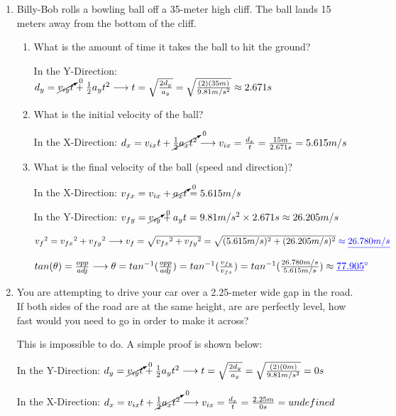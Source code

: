 \documentclass[letterpaper, 12pt]{article}
\begin{document}
\begin{enumerate}
\item Billy-Bob rolls a bowling ball off a 35-meter high cliff.  The ball lands 15 meters away from the bottom of the cliff.
\begin{enumerate}
	\item What is the amount of time it takes the ball to hit the ground?
\color{red}

	In the Y-Direction: $d_y = \cancelto{0}{v_{iy}t} + \frac{1}{2}a_y t^2 \longrightarrow t = \sqrt{\frac{2 d_y}{a_y}} = \sqrt{\frac{(2) (35m)}{9.81 m/s^2}} \approx 2.671 s $
\color{black}

	\item What is the initial velocity of the ball?
	\color{red}
	
	In the X-Direction: $d_x = v_{ix}t+\cancelto{0}{\frac{1}{2}a_xt^2} \longrightarrow v_{ix} = \frac{d_x}{t} = \frac{15 m}{2.671s} = 5.615 m/s$
	
	\color{black}
	
	\item What is the final velocity of the ball (speed and direction)?
		\color{red}

In the X-Direction: $ v_{fx} = v_{ix} + \cancelto{0}{a_x t} = 5.615 m/s$  

In the Y-Direction: $ v_{fy} = \cancelto{0}{v_{iy}} + a_y t = 9.81 m/s^2 \times 2.671s \approx 26.205 m/s$

$ {v_f}^2 = {v_{fx}}^2 + {v_{fy}}^2 \longrightarrow {v_f} = \sqrt{{v_{fx}}^2 + {v_{fy}}^2} = \sqrt{(5.615 m/s)^2 + (26.205 m/s)^2}  \color{blue} \approx \underline{26.780 m/s}  $
\color{red}	

$tan(\theta) = \frac{opp}{adj} \longrightarrow \theta = tan^{-1}(\frac{opp}{adj}) = tan^{-1}(\frac{v_{fy}}{v_{fx}}) =  tan^{-1}(\frac{26.780 m/s}{5.615 m/s}) \approx \color{blue} \underline{77.905} \degree  $


\color{black}




\end{enumerate}



\item You are attempting to drive your car over a 2.25-meter wide gap in the road.  If both sides of the road are at the same height, are are perfectly level, how fast would you need to go in order to make it across?
\color{red}

	This is impossible to do.  A simple proof is shown below:

	In the Y-Direction: $d_y = \cancelto{0}{v_{iy}t} + \frac{1}{2}a_y t^2 \longrightarrow t = \sqrt{\frac{2 d_y}{a_y}} = \sqrt{\frac{(2) (0m)}{9.81 m/s^2}} = 0 s  $ 

	In the X-Direction: $d_x = v_{ix}t+\cancelto{0}{\frac{1}{2}a_xt^2} \longrightarrow v_{ix} = \frac{d_x}{t} = \frac{2.25 m}{0s} = undefined$
	
	
\end{enumerate}
 
\end{document}
